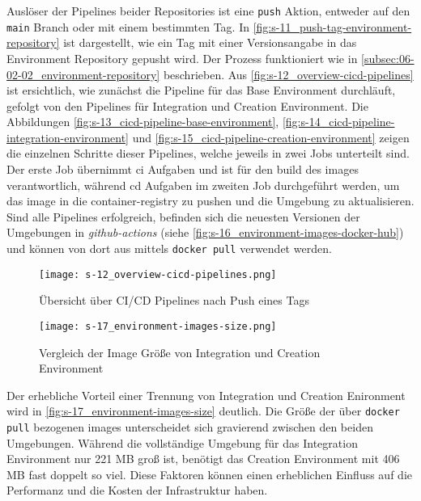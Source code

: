 Auslöser der Pipelines beider Repositories ist eine \texttt{push} Aktion, entweder auf den \texttt{main} Branch oder mit einem bestimmten Tag. In \autoref{fig:s-11_push-tag-environment-repository} ist dargestellt, wie ein Tag mit einer Versionsangabe in das Environment Repository gepusht wird. Der Prozess funktioniert wie in \autoref{subsec:06-02-02_environment-repository} beschrieben. Aus \autoref{fig:s-12_overview-cicd-pipelines} ist ersichtlich, wie zunächst die Pipeline für das Base Environment durchläuft, gefolgt von den Pipelines für Integration und Creation Environment. Die Abbildungen \ref{fig:s-13_cicd-pipeline-base-environment}, \ref{fig:s-14_cicd-pipeline-integration-environment} und \ref{fig:s-15_cicd-pipeline-creation-environment} zeigen die einzelnen Schritte dieser Pipelines, welche jeweils in zwei Jobs unterteilt sind. Der erste Job übernimmt \Gls{ci} Aufgaben und ist für den \Gls{build} des \Glspl{image} verantwortlich, während \Gls{cd} Aufgaben im zweiten Job durchgeführt werden, um das \Gls{image} in die \Gls{container-registry} zu pushen und die Umgebung zu aktualisieren. Sind alle Pipelines erfolgreich, befinden sich die neuesten Versionen der Umgebungen in \textit{\Gls{github-actions}} (siehe \autoref{fig:s-16_environment-images-docker-hub}) und können von dort aus mittels \texttt{docker pull} verwendet werden.

\begin{figure}[H]
    \centering
    \texttt{[image: s-12\_overview-cicd-pipelines.png]}
    \caption{Übersicht über CI/CD Pipelines nach Push eines Tags}
    \label{fig:s-12_overview-cicd-pipelines}
\end{figure}

\begin{figure}[H]
    \centering
    \texttt{[image: s-17\_environment-images-size.png]}
    \caption{Vergleich der Image Größe von Integration und Creation Environment}
    \label{fig:s-17_environment-images-size}
\end{figure}

Der erhebliche Vorteil einer Trennung von Integration und Creation Enironment wird in \autoref{fig:s-17_environment-images-size} deutlich. Die Größe der über \texttt{docker pull} bezogenen \Glspl{image} unterscheidet sich gravierend zwischen den beiden Umgebungen. Während die vollständige Umgebung für das Integration Environment nur 221 MB groß ist, benötigt das Creation Environment mit 406 MB fast doppelt so viel. Diese Faktoren können einen erheblichen Einfluss auf die Performanz und die Kosten der Infrastruktur haben.

